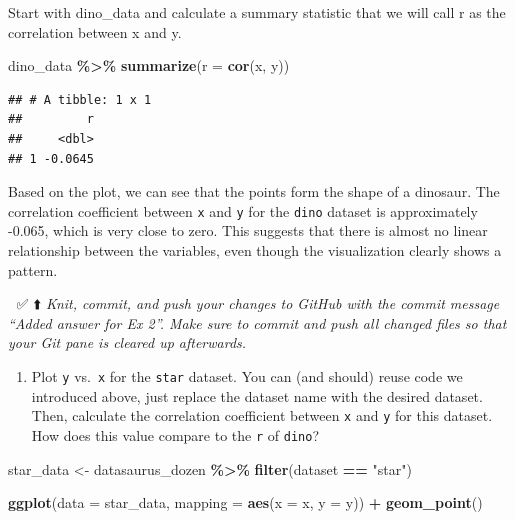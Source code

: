 \documentclass[
]{article}
\newenvironment{Shaded}{\begin{snugshade}}{\end{snugshade}}
\newcommand{\AttributeTok}[1]{\textcolor[rgb]{0.13,0.29,0.53}{#1}}
\newcommand{\FunctionTok}[1]{\textcolor[rgb]{0.13,0.29,0.53}{\textbf{#1}}}
\newcommand{\NormalTok}[1]{#1}
\newcommand{\OtherTok}[1]{\textcolor[rgb]{0.56,0.35,0.01}{#1}}
\newcommand{\SpecialCharTok}[1]{\textcolor[rgb]{0.81,0.36,0.00}{\textbf{#1}}}
\newcommand{\StringTok}[1]{\textcolor[rgb]{0.31,0.60,0.02}{#1}}
\providecommand{\tightlist}{%
  \setlength{\itemsep}{0pt}\setlength{\parskip}{0pt}}
\begin{document}
\begin{Shaded}
\begin{Highlighting}[]
\NormalTok{Start with \textasciigrave{}dino\_data\textasciigrave{} and calculate a summary statistic that we will call \textasciigrave{}r\textasciigrave{} as the \textasciigrave{}cor\textasciigrave{}relation between \textasciigrave{}x\textasciigrave{} and \textasciigrave{}y\textasciigrave{}.}
\end{Highlighting}
\end{Shaded}

\begin{Shaded}
\begin{Highlighting}[]
\NormalTok{dino\_data }\SpecialCharTok{\%\textgreater{}\%}
  \FunctionTok{summarize}\NormalTok{(}\AttributeTok{r =} \FunctionTok{cor}\NormalTok{(x, y))}
\end{Highlighting}
\end{Shaded}

\begin{verbatim}
## # A tibble: 1 x 1
##         r
##     <dbl>
## 1 -0.0645
\end{verbatim}

Based on the plot, we can see that the points form the shape of a
dinosaur. The correlation coefficient between \texttt{x} and \texttt{y}
for the \texttt{dino} dataset is approximately -0.065, which is very
close to zero. This suggests that there is almost no linear relationship
between the variables, even though the visualization clearly shows a
pattern.

🧶 ✅ ⬆️ \emph{Knit, commit, and push your changes to GitHub with the
commit message ``Added answer for Ex 2''. Make sure to commit and push
all changed files so that your Git pane is cleared up afterwards.}

\begin{enumerate}
\def\labelenumi{\arabic{enumi}.}
\setcounter{enumi}{2}
\tightlist
\item
  Plot \texttt{y} vs.~\texttt{x} for the \texttt{star} dataset. You can
  (and should) reuse code we introduced above, just replace the dataset
  name with the desired dataset. Then, calculate the correlation
  coefficient between \texttt{x} and \texttt{y} for this dataset. How
  does this value compare to the \texttt{r} of \texttt{dino}?
\end{enumerate}

\begin{Shaded}
\begin{Highlighting}[]
\NormalTok{star\_data }\OtherTok{\textless{}{-}}\NormalTok{ datasaurus\_dozen }\SpecialCharTok{\%\textgreater{}\%}
  \FunctionTok{filter}\NormalTok{(dataset }\SpecialCharTok{==} \StringTok{"star"}\NormalTok{)}

\FunctionTok{ggplot}\NormalTok{(}\AttributeTok{data =}\NormalTok{ star\_data, }\AttributeTok{mapping =} \FunctionTok{aes}\NormalTok{(}\AttributeTok{x =}\NormalTok{ x, }\AttributeTok{y =}\NormalTok{ y)) }\SpecialCharTok{+}
  \FunctionTok{geom\_point}\NormalTok{()}
\end{Highlighting}
\end{Shaded}
\end{document}
